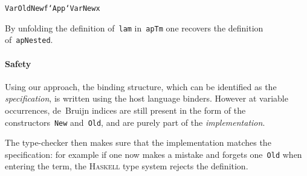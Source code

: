 \documentclass[9pt,authoryear]{sigplanconf}
\begin{document}
{{}\vphantom{$\{$}}\texttt{\mbox{\hspace{0.50em}}}\texttt{\mbox{\hspace{0.50em}}}\texttt{\mbox{\hspace{0.50em}}}\texttt{\mbox{\hspace{0.50em}}}\texttt{\mbox{\hspace{0.50em}}}\texttt{\mbox{\hspace{0.50em}}}\texttt{\mbox{\hspace{0.50em}}}\texttt{\mbox{\hspace{0.50em}}}\texttt{\mbox{\hspace{0.50em}}}\texttt{\mbox{\hspace{0.50em}}}\texttt{Var}\texttt{\mbox{\hspace{0.50em}}}\texttt{\makebox[1.22ex][l]{$ {(} $}}\texttt{Old}\texttt{\mbox{\hspace{0.50em}}}\texttt{\makebox[1.22ex][l]{$ {(} $}}\texttt{New}\texttt{\mbox{\hspace{0.50em}}}\texttt{f}\texttt{\makebox[1.22ex][r]{$ {)} $}}\texttt{\makebox[1.22ex][r]{$ {)} $}}\texttt{\mbox{\hspace{0.50em}}}\texttt{{`}App{`}}\texttt{\mbox{\hspace{0.50em}}}\texttt{Var}\texttt{\mbox{\hspace{0.50em}}}\texttt{\makebox[1.22ex][l]{$ {(} $}}\texttt{New}\texttt{\mbox{\hspace{0.50em}}}\texttt{x}\texttt{\makebox[1.22ex][r]{$ {)} $}}\texttt{{\nopagebreak \newline%
}\vphantom{$\{$}}%


%
By unfolding the definition of{~}\texttt{lam} in{~}\texttt{apTm\makebox[1.22ex][c]{\_{}}} one recovers the
    definition of{~}\texttt{apNested}.%


\paragraph*{Safety}

%
Using our approach, the binding structure, which can be identified
    as the \emph{specification}, is written using the host language
    binders.
    However at variable occurrences, de{~}Bruijn indices are still present
    in the form of the constructors{~}\texttt{New} and{~}\texttt{Old}, and are purely
    part of the \emph{implementation}.%


%
The type-checker then makes sure that the implementation matches the
    specification{:} for example if one now makes a mistake and forgets
    one{~}\texttt{Old} when entering the term, the \textsc{Haskell} type system
    rejects the definition.%
\end{document}

